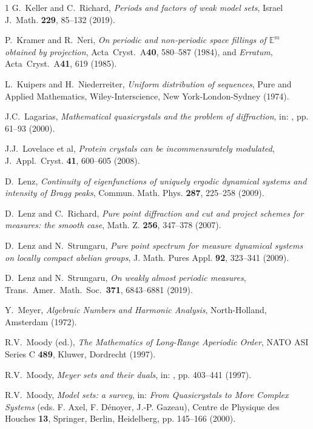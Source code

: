 \documentclass[11pt, a4wide]{amsart}
\numberwithin{lemma}{section}
\begin{document}
\begin{thebibliography}{1}
{G.~Keller and C.~Richard, \textit{Periods and factors of weak model sets},
Israel J.~Math. \textbf{229}, 85--132 (2019).}

{P.~Kramer and R.~Neri, \textit{On periodic and non-periodic space fillings of $\mathbb E^m$ obtained by projection}, Acta~Cryst.~A\textbf{40}, 580--587 (1984), and \textit{Erratum}, Acta~Cryst.~A\textbf{41}, 619 (1985).}

{L.~Kuipers and H.~Niederreiter,
\textit{Uniform distribution of sequences}, 
Pure and Applied Mathematics, Wiley-Interscience, New York-London-Sydney (1974).}

{J.C.~Lagarias, \textit{Mathematical quasicrystals
and the problem of diffraction}, in: \cite{BMed}, pp. 61--93 (2000).}


{J.J.~Lovelace et al, \textit{Protein crystals can be incommensurately modulated},
J.~Appl.~Cryst. \textbf{41}, 600--605 (2008).}


{D.~Lenz,
\textit{Continuity of eigenfunctions of uniquely ergodic dynamical systems and intensity of Bragg peaks}, Commun. Math. Phys. \textbf{287}, 225--258 (2009).}

{D.\ Lenz and C.\ Richard, \textit{Pure point diffraction and cut and project schemes for measures: the smooth case},
Math. Z. \textbf{256}, 347--378 (2007).}

{D.~Lenz and N.~Strungaru,
\textit{Pure point spectrum for measure dynamical systems on locally compact abelian groups}, J. Math. Pures Appl. \textbf{92}, 323--341 (2009).}

{D.~Lenz and N.~Strungaru,
\textit{On weakly almost periodic measures}, Trans.~Amer.~Math.~Soc.~\textbf{371}, 6843--6881 (2019).}

{Y.~Meyer, \textit{Algebraic Numbers and  Harmonic Analysis},
North-Holland, Amsterdam (1972).}

{R.V.~Moody (ed.),
\textit{The Mathematics of Long-Range Aperiodic Order},
NATO ASI Series C \textbf{489}, Kluwer, Dordrecht (1997).}

{R.V.~Moody,
\textit{Meyer sets and their duals}, in: \cite{Moo}, pp. 403--441 (1997).}

{R.V.~Moody,
\textit{Model sets: a survey}, in: \textit{From Quasicrystals to More Complex Systems} (eds. F. Axel, F. D\'enoyer, J.-P. Gazeau), Centre de Physique des Houches \textbf{13},  Springer, Berlin, Heidelberg, pp. 145--166 (2000).}



\end{thebibliography}
\end{document}
